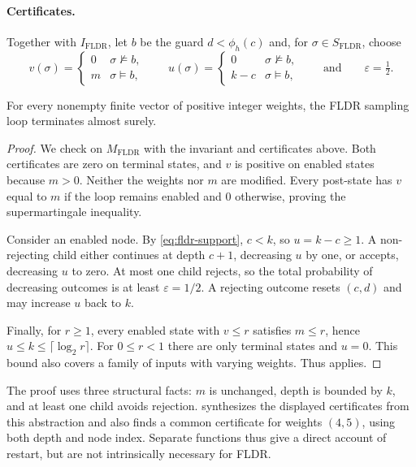 \paragraph{Certificates.}
Together with $I_{\mathrm{FLDR}}$, let $b$ be the guard
$d<\phi_h(c)$ and, for $\sigma\in S_{\mathrm{FLDR}}$, choose
\[
 v(\sigma)=\begin{cases}0&\sigma\not\models b,\\m&\sigma\models b,\end{cases}
 \qquad
 u(\sigma)=\begin{cases}0&\sigma\not\models b,\\k-c&\sigma\models b,\end{cases}
 \qquad\text{and}\qquad
 \varepsilon=\tfrac12.
\]
\begin{theorem}
\label{thm:fldr}
For every nonempty finite vector of positive integer weights, the FLDR
sampling loop terminates almost surely.
\end{theorem}
\begin{proof}
We check  on $M_{\mathrm{FLDR}}$ with the
invariant and certificates above.
Both certificates are zero on terminal states, and $v$ is positive on
enabled states because $m>0$. Neither the weights nor $m$ are modified.
Every post-state has $v$ equal to $m$ if the loop remains enabled and
$0$ otherwise, proving the supermartingale inequality.

Consider an enabled node. By \eqref{eq:fldr-support}, $c<k$, so
$u=k-c\geq1$. A non-rejecting child either continues at depth $c+1$,
decreasing $u$ by one, or accepts, decreasing $u$ to zero. At most one
child rejects, so the total probability of decreasing outcomes is at
least $\varepsilon=1/2$. A rejecting outcome resets $(c,d)$ and may
increase $u$ back to $k$.

Finally, for $r\geq1$, every enabled state with $v\leq r$ satisfies
$m\leq r$, hence $u\leq k\leq\lceil\log_2r\rceil$.
For $0\leq r<1$ there are only terminal states and $u=0$.
This bound also covers a family of inputs with varying weights.
Thus  applies.
\end{proof}

The proof uses three structural facts: $m$ is unchanged, depth is bounded
by $k$, and at least one child avoids rejection.
 synthesizes the displayed certificates
from this abstraction and also finds a common certificate for weights
$(4,5)$, using both depth and node index. Separate functions thus give
a direct account of restart, but are not intrinsically necessary for FLDR.

